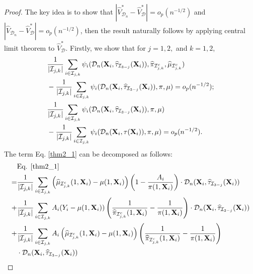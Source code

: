 \documentclass[11pt]{article}
\theoremstyle{referenceplain}
\theoremstyle{referencedefinition}
\theoremstyle{referenceremark}
\begin{document}
\begin{proof}
     The key idea is to show that $|\widehat{V}_{\mathcal{D}_n}^* - \widehat{V}_{\mathcal{D}}^*|=o_p(n^{-1/2})$ and $|\widehat{V}_{\mathcal{D}_n} - \widehat{V}_{\mathcal{D}}^*|=o_p(n^{-1/2})$, then the result naturally follows by applying central limit theorem to $\widehat{V}_{\mathcal{D}}^*$.  Firstly, we show that for $j=1,2,$ and $k=1,2$,
    \begin{align}
       &\frac{1}{|\mathcal{I}_{j,k}|}\sum_{i\in\mathcal{I}_{j,k}}\psi_i(\mathcal{D}_n(\mathbf{X}_i,\widehat{\tau}_{\mathcal{I}_{3-j}}(\mathbf{X}_i)),\widehat{\pi}_{\mathcal{I}_{j,k}^c},\widehat{\mu}_{\mathcal{I}_{j,k}^c})\notag\\
       &-\frac{1}{|\mathcal{I}_{j,k}|}\sum_{i\in\mathcal{I}_{j,k}}\psi_i(\mathcal{D}_n(\mathbf{X}_i,\widehat{\tau}_{\mathcal{I}_{3-j}}(\mathbf{X}_i)),\pi,\mu)=o_p(n^{-1/2});\label{thm2_1}\\
        &\frac{1}{|\mathcal{I}_{j,k}|}\sum_{i\in\mathcal{I}_{j,k}}\psi_i(\mathcal{D}_n(\mathbf{X}_i,\widehat{\tau}_{\mathcal{I}_{3-j}}(\mathbf{X}_i)),\pi,\mu)\notag\\
        &-\frac{1}{|\mathcal{I}_{j,k}|}\sum_{i\in\mathcal{I}_{j,k}}\psi_i(\mathcal{D}_n(\mathbf{X}_i,\tau(\mathbf{X}_i)),\pi,\mu)=o_p(n^{-1/2}).\label{thm2_2}
    \end{align}
    The term Eq. \eqref{thm2_1} can be decomposed as follows:
    \begin{align}
        &\text{Eq. }\eqref{thm2_1}\notag\\
        =&\frac{1}{|\mathcal{I}_{j,k}|}\sum_{i\in\mathcal{I}_{j,k}}\left(\widehat{\mu}_{\mathcal{I}_{j,k}^c}(1,\mathbf{X}_i)-\mu(1,\mathbf{X}_i)\right)\left(1-\frac{A_i}{\pi(1,\mathbf{X}_i)}\right)\cdot \mathcal{D}_n(\mathbf{X}_i,\widehat{\tau}_{\mathcal{I}_{3-j}}(\mathbf{X}_i))\label{thm2_1_1}\\
        +&\frac{1}{|\mathcal{I}_{j,k}|}\sum_{i\in\mathcal{I}_{j,k}} A_i (Y_i-\mu(1,\mathbf{X}_i))\left(\frac{1}{\widehat{\pi}_{\mathcal{I}_{j,k}^c}(1,\mathbf{X}_i)}-\frac{1}{\pi(1,\mathbf{X}_i)}\right)\cdot \mathcal{D}_n(\mathbf{X}_i,\widehat{\tau}_{\mathcal{I}_{3-j}}(\mathbf{X}_i))\label{thm2_1_2}\\
        +&\frac{1}{|\mathcal{I}_{j,k}|}\sum_{i\in\mathcal{I}_{j,k}} A_i \left(\widehat{\mu}_{\mathcal{I}_{j,k}^c}(1,\mathbf{X}_i)-\mu(1,\mathbf{X}_i)\right)\left(\frac{1}{\widehat{\pi}_{\mathcal{I}_{j,k}^c}(1,\mathbf{X}_i)}-\frac{1}{\pi(1,\mathbf{X}_i)}\right)\notag\\
        &\cdot \mathcal{D}_n(\mathbf{X}_i,\widehat{\tau}_{\mathcal{I}_{3-j}}(\mathbf{X}_i))\label{thm2_1_3}\\

\end{align}
\end{proof}
\end{document}
